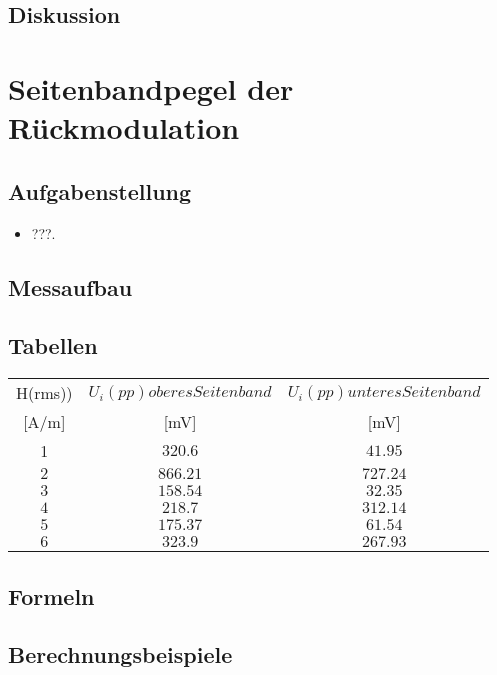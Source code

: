\documentclass[12pt,a4paper,ngerman]{article}
\begin{document}
\subsection{Diskussion}

\section{Seitenbandpegel der Rückmodulation}
\subsection{Aufgabenstellung}

\begin{itemize}
\item???.
\end{itemize}


\subsection{Messaufbau}

\subsection{Tabellen}
\begin{tabular}{ |c|c|c| }
  \hline

    H(rms)) & $U_i(pp) oberes Seitenband$ & $U_i(pp) unteres Seitenband$\\

	[A/m] & [mV] & [mV] \\
  \hline
  1 & $320.6$ & $41.95$\\
  \hline
  $2$ & $866.21$ & $727.24$ \\
  \hline
  $3$ & $158.54$ & $32.35$\\
  \hline
  $4$ & $218.7$ & $312.14$\\
    \hline
  $5$ & $175.37$ & $61.54$\\
    \hline
  $6$ & $323.9$ & $267.93$ \\
    \hline
  \hline
 
\end{tabular} 
\subsection{Formeln}

\subsection{Berechnungsbeispiele}
\end{document}
